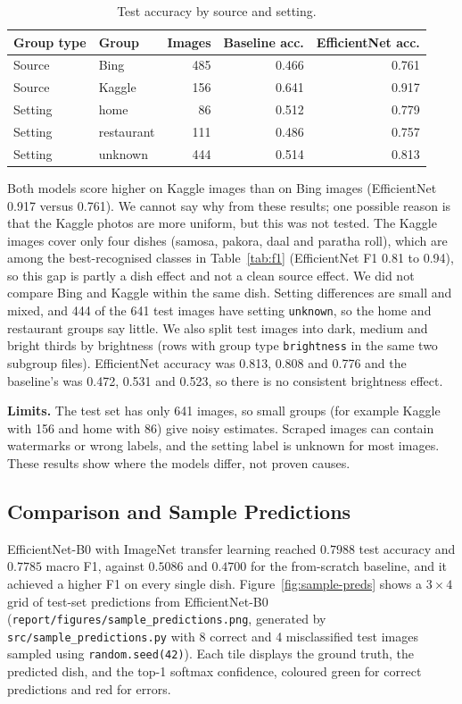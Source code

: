 \begin{table}[H]
  \centering
  \begin{tabular}{|l|l|r|r|r|}
    \hline
    \textbf{Group type} & \textbf{Group} & \textbf{Images} &
    \textbf{Baseline acc.} & \textbf{EfficientNet acc.} \\ \hline
    Source  & Bing       & 485 & 0.466 & 0.761 \\ \hline
    Source  & Kaggle     & 156 & 0.641 & 0.917 \\ \hline
    Setting & home       &  86 & 0.512 & 0.779 \\ \hline
    Setting & restaurant & 111 & 0.486 & 0.757 \\ \hline
    Setting & unknown    & 444 & 0.514 & 0.813 \\ \hline
  \end{tabular}
  \caption{Test accuracy by source and setting.}
  \label{tab:subgroups}
\end{table}

Both models score higher on Kaggle images than on Bing images (EfficientNet
0.917 versus 0.761). We cannot say why from these results; one possible
reason is that the Kaggle photos are more uniform, but this was not tested.
The Kaggle images cover only four dishes (samosa, pakora, daal and paratha
roll), which are among the best-recognised classes in Table~\ref{tab:f1}
(EfficientNet F1 0.81 to 0.94), so this gap is partly a dish effect and not a
clean source effect. We did not compare Bing and Kaggle within the same dish.
Setting differences are small and mixed, and 444 of the 641 test images
have setting \texttt{unknown}, so the home and restaurant groups say little.
We also split test images into dark, medium and bright thirds by brightness
(rows with group type \texttt{brightness} in the same two subgroup files).
EfficientNet accuracy was 0.813, 0.808 and 0.776 and the baseline's was
0.472, 0.531 and 0.523, so there is no consistent brightness effect.

\textbf{Limits.} The test set has only 641 images, so small groups (for
example Kaggle with 156 and home with 86) give noisy estimates. Scraped
images can contain watermarks or wrong labels, and the setting label is
unknown for most images. These results show where the models differ, not
proven causes.

\subsection{Comparison and Sample Predictions}
EfficientNet-B0 with ImageNet transfer learning reached $0.7988$ test accuracy
and $0.7785$ macro F1, against $0.5086$ and $0.4700$ for the from-scratch
baseline, and it achieved a higher F1 on every single dish. Figure~\ref{fig:sample-preds}
shows a $3 \times 4$ grid of test-set predictions from EfficientNet-B0
(\texttt{report/figures/sample\_predictions.png}, generated by
\texttt{src/sample\_predictions.py} with 8 correct and 4 misclassified test
images sampled using \texttt{random.seed(42)}). Each tile displays the ground
truth, the predicted dish, and the top-1 softmax confidence, coloured green
for correct predictions and red for errors.

